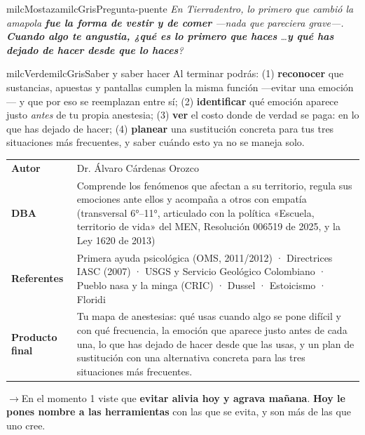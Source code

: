 \documentclass[11pt,letterpaper]{article}
\newcommand{\puente}[1]{%
  \begin{puentebox}%
    \textcolor{milcGradeDark}{$\rightarrow$}\hspace{2mm}#1%
  \end{puentebox}%
}
\begin{document}
\begin{softbox}{milcMostaza}{milcGris}{Pregunta-puente}
\textit{En Tierradentro, lo primero que cambió la amapola \textbf{fue la forma de vestir y de comer} ---nada que pareciera grave---. \textbf{Cuando algo te angustia, ¿qué es lo primero que haces} \ldots \textbf{y qué has dejado de hacer desde que lo haces}?}
\end{softbox}

\begin{softbox}{milcVerde}{milcGris}{Saber y saber hacer}
Al terminar podrás: (1) \textbf{reconocer} que sustancias, apuestas y pantallas cumplen la misma función ---evitar una emoción--- y que por eso se reemplazan entre sí; (2) \textbf{identificar} qué emoción aparece justo \emph{antes} de tu propia anestesia; (3) \textbf{ver} el costo donde de verdad se paga: en lo que has dejado de hacer; (4) \textbf{planear} una sustitución concreta para tus tres situaciones más frecuentes, y saber cuándo esto ya no se maneja solo.
\end{softbox}



\small
\begin{tabularx}{\textwidth}{>{\bfseries}p{3.0cm}Y}
Autor & Dr. Álvaro Cárdenas Orozco\\
DBA & Comprende los fenómenos que afectan a su territorio, regula sus emociones ante ellos y acompaña a otros con empatía (transversal 6°--11°, articulado con la política «Escuela, territorio de vida» del MEN, Resolución 006519 de 2025, y la Ley 1620 de 2013)\\
Referentes & Primera ayuda psicológica (OMS, 2011/2012) · Directrices IASC (2007) · USGS y Servicio Geológico Colombiano · Pueblo nasa y la minga (CRIC) · Dussel · Estoicismo · Floridi\\
Producto final & Tu mapa de anestesias: qué usas cuando algo se pone difícil y con qué frecuencia, la emoción que aparece justo antes de cada una, lo que has dejado de hacer desde que las usas, y un plan de sustitución con una alternativa concreta para las tres situaciones más frecuentes.\\
\end{tabularx}
\normalsize

\puente{En el momento 1 viste que \textbf{evitar alivia hoy y agrava mañana}. \textbf{Hoy le pones nombre a las herramientas} con las que se evita, y son más de las que uno cree.}
\end{document}
